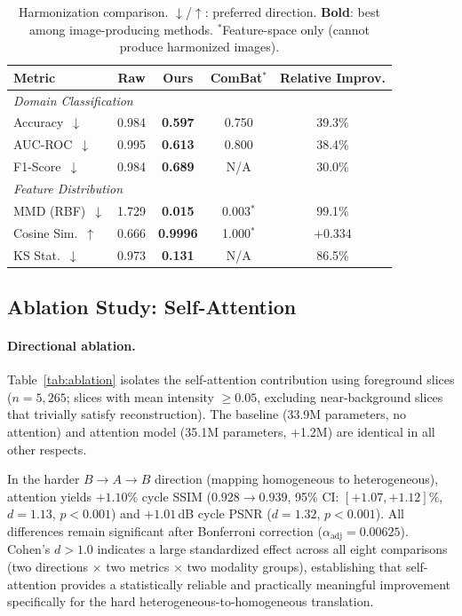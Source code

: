 \documentclass{article}
\begin{document}
\begin{table}[t]
  \centering
  \caption{Harmonization comparison. $\downarrow$/$\uparrow$: preferred direction.
    \textbf{Bold}: best among image-producing methods. $^{*}$Feature-space only
    (cannot produce harmonized images).}
  \label{tab:main}
  \small
  \begin{tabular}{lcccc}
    \toprule
    Metric & Raw & Ours & ComBat$^{*}$ & Relative Improv. \\
    \midrule
    \multicolumn{5}{l}{\textit{Domain Classification}} \\
    \quad Accuracy~$\downarrow$  & 0.984 & \textbf{0.597} & 0.750 & 39.3\% \\
    \quad AUC-ROC~$\downarrow$   & 0.995 & \textbf{0.613} & 0.800 & 38.4\% \\
    \quad F1-Score~$\downarrow$  & 0.984 & \textbf{0.689} & N/A   & 30.0\% \\
    \midrule
    \multicolumn{5}{l}{\textit{Feature Distribution}} \\
    \quad MMD (RBF)~$\downarrow$ & 1.729 & \textbf{0.015} & 0.003$^{*}$ & 99.1\% \\
    \quad Cosine Sim.~$\uparrow$ & 0.666 & \textbf{0.9996} & 1.000$^{*}$ & $+$0.334 \\
    \quad KS Stat.~$\downarrow$  & 0.973 & \textbf{0.131} & N/A & 86.5\% \\
    \bottomrule
  \end{tabular}
\end{table}

\subsection{Ablation Study: Self-Attention}

\paragraph{Directional ablation.}
Table~\ref{tab:ablation} isolates the self-attention contribution using foreground slices
($n{=}5{,}265$; slices with mean intensity $\geq 0.05$, excluding near-background slices
that trivially satisfy reconstruction). The baseline (33.9M parameters, no attention)
and attention model (35.1M parameters, +1.2M) are identical in all other respects.

In the harder $B{\to}A{\to}B$ direction (mapping homogeneous to heterogeneous), attention
yields $+1.10\%$ cycle SSIM ($0.928 \to 0.939$, 95\% CI: $[+1.07, +1.12]\%$,
$d{=}1.13$, $p{<}0.001$) and $+1.01$\,dB cycle PSNR ($d{=}1.32$, $p{<}0.001$). All
differences remain significant after Bonferroni correction ($\alpha_{\mathrm{adj}}{=}0.00625$).
Cohen's $d > 1.0$ indicates a large standardized effect across all eight comparisons
(two directions $\times$ two metrics $\times$ two modality groups), establishing that
self-attention provides a statistically reliable and practically meaningful improvement
specifically for the hard heterogeneous-to-homogeneous translation.
\end{document}
